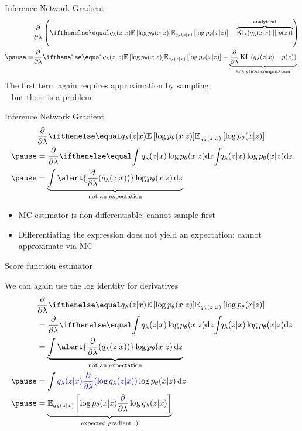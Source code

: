 \begin{frame}{Inference Network Gradient}
\begin{equation*}
\begin{aligned}
&\pdv{\lambda}\left(\E[q_\lambda(z|x)]{\log p_\theta(x|z)} - \overbrace{\KL{q_\lambda(z|x)}{p(z)}}^{\text{analytical}} \right) \\ \pause
=&\pdv{\lambda}\E[q_\lambda(z|x)]{\log p_\theta(x|z)} - \underbrace{\pdv{\lambda}\KL{q_\lambda(z|x)}{p(z)}}_{\text{analytical computation}} \\
\end{aligned}
\end{equation*}
\pause
The first term again requires approximation by sampling, \\
~ but there is a problem

\end{frame}

\begin{frame}{Inference Network Gradient}
\begin{equation*}
\begin{aligned}
&\pdv{\lambda}\E[q_\lambda(z|x)]{\log p_\theta(x|z)} \\ \pause
&= \pdv{\lambda} \intl{q_\lambda(z|x)\log p_\theta(x|z)}{z} \\ \pause
&=  \underbrace{\int \alert{\pdv{\lambda}(q_\lambda(z|x))}\log p_\theta(x|z) \dd{z}}_{\text{not an expectation}} 
\end{aligned}
\end{equation*}

\pause

\begin{itemize}
	\item MC estimator is non-differentiable: cannot sample first\\ \pause
	\item Differentiating the expression does not yield an expectation: cannot approximate via MC
\end{itemize}

\end{frame}

\begin{frame}{Score function estimator}

We can again use the log identity for derivatives
\begin{equation*}
\begin{aligned}
&\pdv{\lambda}\E[q_\lambda(z|x)]{\log p_\theta(x|z)} \\ 
&= \pdv{\lambda} \intl{q_\lambda(z|x)\log p_\theta(x|z)}{z} \\ 
&=  \underbrace{\int \alert{\pdv{\lambda}(q_\lambda(z|x))}\log p_\theta(x|z) \dd{z}}_{\text{not an expectation}} \\ \pause
&= \int \textcolor{blue}{q_\lambda(z|x) \pdv{\lambda}(\log q_\lambda(z|x))} \log p_\theta(x|z) \dd{z} \\ \pause
&= \underbrace{\mathbb E_{q_\lambda(z|x)} \left[  \log p_\theta(x|z)  \pdv{\lambda}\log q_\lambda(z|x)\right]}_{\text{expected gradient :)}}
\end{aligned}
\end{equation*}

\end{frame}

